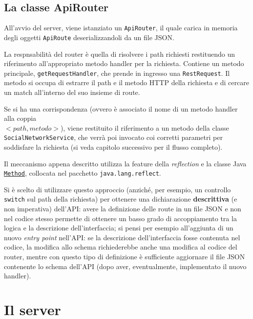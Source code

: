 \documentclass[a4paper,8pt]{article} %
\def\code#1{\texttt{#1}}
\begin{document}
\subsection{La classe ApiRouter}
All'avvio del server, viene istanziato un \code{ApiRouter}, il quale carica in memoria degli oggetti \code{ApiRoute} deserializzandoli da un file JSON.
\par La respnsabilità del router è quella di risolvere i path richiesti restituendo un riferimento all'appropriato metodo handler per la richiesta.
Contiene un metodo principale, \code{getRequestHandler}, che prende in ingresso una \code{RestRequest}.
Il metodo si occupa di estrarre il path e il metodo HTTP della richiesta e di cercare un match all'interno del suo insieme di route.
\par Se si ha una corrispondenza (ovvero è associato il nome di un metodo handler alla coppia\\ $<path, metodo>$),
viene restituito il riferimento a un metodo della classe \code{SocialNetworkService}, che verrà poi invocato coi corretti parametri per
soddisfare la richiesta (si veda capitolo successivo per il flusso completo).
\par Il meccanismo appena descritto utilizza la feature della \emph{reflection} e la classe Java \href{https://docs.oracle.com/javase/8/docs/api/java/lang/reflect/Method.html}{\code{Method}},
collocata nel pacchetto \code{java.lang.reflect}.
\par Si è scelto di utilizzare questo approccio (anziché, per esempio, un controllo \code{switch} sul path della richiesta) per ottenere una dichiarazione \textbf{descrittiva} (e non imperativa) dell'API:
avere la definizione delle route in un file JSON e non nel codice stesso permette di ottenere un basso grado di accoppiamento tra la logica e la descrizione dell'interfaccia; si pensi per
esempio all'aggiunta di un nuovo \emph{entry point} nell'API: se la descrizione dell'interfaccia fosse contenuta nel codice, la modifica allo schema richiederebbe anche una modifica al codice del router,
mentre con questo tipo di definizione è sufficiente aggiornare il file JSON contenente lo schema dell'API (dopo aver, eventualmente, implementato il nuovo handler).



\section{Il server}
\end{document}
